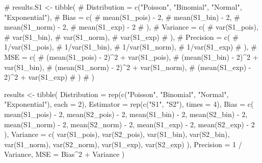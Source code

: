\documentclass[
]{article}
\newenvironment{Shaded}{\begin{snugshade}}{\end{snugshade}}
\newcommand{\AttributeTok}[1]{\textcolor[rgb]{0.40,0.45,0.13}{#1}}
\newcommand{\CommentTok}[1]{\textcolor[rgb]{0.37,0.37,0.37}{#1}}
\newcommand{\DecValTok}[1]{\textcolor[rgb]{0.68,0.00,0.00}{#1}}
\newcommand{\FunctionTok}[1]{\textcolor[rgb]{0.28,0.35,0.67}{#1}}
\newcommand{\NormalTok}[1]{\textcolor[rgb]{0.00,0.23,0.31}{#1}}
\newcommand{\OtherTok}[1]{\textcolor[rgb]{0.00,0.23,0.31}{#1}}
\newcommand{\SpecialCharTok}[1]{\textcolor[rgb]{0.37,0.37,0.37}{#1}}
\newcommand{\StringTok}[1]{\textcolor[rgb]{0.13,0.47,0.30}{#1}}
\begin{document}
\begin{Shaded}
\begin{Highlighting}[numbers=left,,]
\CommentTok{\# results.S1 \textless{}{-} tibble(}
\CommentTok{\#   Distribution = c("Poisson", "Binomial", "Normal", "Exponential"),}
\CommentTok{\#   Bias = c(}
\CommentTok{\#     mean(S1\_pois) {-} 2,}
\CommentTok{\#     mean(S1\_bin) {-} 2,}
\CommentTok{\#     mean(S1\_norm) {-} 2,}
\CommentTok{\#     mean(S1\_exp) {-} 2}
\CommentTok{\#   ),}
\CommentTok{\#   Variance = c(}
\CommentTok{\#     var(S1\_pois),}
\CommentTok{\#     var(S1\_bin),}
\CommentTok{\#     var(S1\_norm),}
\CommentTok{\#     var(S1\_exp)}
\CommentTok{\#   ),}
\CommentTok{\#   Precision = c(}
\CommentTok{\#     1/var(S1\_pois),}
\CommentTok{\#     1/var(S1\_bin),}
\CommentTok{\#     1/var(S1\_norm),}
\CommentTok{\#     1/var(S1\_exp)}
\CommentTok{\#   ),}
\CommentTok{\#   MSE = c(}
\CommentTok{\#     (mean(S1\_pois) {-} 2)\^{}2 + var(S1\_pois),}
\CommentTok{\#     (mean(S1\_bin) {-} 2)\^{}2 + var(S1\_bin),}
\CommentTok{\#     (mean(S1\_norm) {-} 2)\^{}2 + var(S1\_norm),}
\CommentTok{\#     (mean(S1\_exp) {-} 2)\^{}2 + var(S1\_exp)}
\CommentTok{\#   )}
\CommentTok{\# )}

\NormalTok{results }\OtherTok{\textless{}{-}} \FunctionTok{tibble}\NormalTok{(}
  \AttributeTok{Distribution =} \FunctionTok{rep}\NormalTok{(}\FunctionTok{c}\NormalTok{(}\StringTok{"Poisson"}\NormalTok{, }\StringTok{"Binomial"}\NormalTok{, }\StringTok{"Normal"}\NormalTok{, }\StringTok{"Exponential"}\NormalTok{), }\AttributeTok{each =} \DecValTok{2}\NormalTok{),}
  \AttributeTok{Estimator =} \FunctionTok{rep}\NormalTok{(}\FunctionTok{c}\NormalTok{(}\StringTok{"S1"}\NormalTok{, }\StringTok{"S2"}\NormalTok{), }\AttributeTok{times =} \DecValTok{4}\NormalTok{),}
  \AttributeTok{Bias =} \FunctionTok{c}\NormalTok{(}
    \FunctionTok{mean}\NormalTok{(S1\_pois) }\SpecialCharTok{{-}} \DecValTok{2}\NormalTok{, }\FunctionTok{mean}\NormalTok{(S2\_pois) }\SpecialCharTok{{-}} \DecValTok{2}\NormalTok{,}
    \FunctionTok{mean}\NormalTok{(S1\_bin)  }\SpecialCharTok{{-}} \DecValTok{2}\NormalTok{, }\FunctionTok{mean}\NormalTok{(S2\_bin)  }\SpecialCharTok{{-}} \DecValTok{2}\NormalTok{,}
    \FunctionTok{mean}\NormalTok{(S1\_norm) }\SpecialCharTok{{-}} \DecValTok{2}\NormalTok{, }\FunctionTok{mean}\NormalTok{(S2\_norm) }\SpecialCharTok{{-}} \DecValTok{2}\NormalTok{,}
    \FunctionTok{mean}\NormalTok{(S1\_exp)  }\SpecialCharTok{{-}} \DecValTok{2}\NormalTok{, }\FunctionTok{mean}\NormalTok{(S2\_exp)  }\SpecialCharTok{{-}} \DecValTok{2}
\NormalTok{  ),}
  \AttributeTok{Variance =} \FunctionTok{c}\NormalTok{(}
    \FunctionTok{var}\NormalTok{(S1\_pois), }\FunctionTok{var}\NormalTok{(S2\_pois),}
    \FunctionTok{var}\NormalTok{(S1\_bin),  }\FunctionTok{var}\NormalTok{(S2\_bin),}
    \FunctionTok{var}\NormalTok{(S1\_norm), }\FunctionTok{var}\NormalTok{(S2\_norm),}
    \FunctionTok{var}\NormalTok{(S1\_exp),  }\FunctionTok{var}\NormalTok{(S2\_exp)}
\NormalTok{  ),}
  \AttributeTok{Precision =} \DecValTok{1} \SpecialCharTok{/}\NormalTok{ Variance,}
  \AttributeTok{MSE =}\NormalTok{ Bias}\SpecialCharTok{\^{}}\DecValTok{2} \SpecialCharTok{+}\NormalTok{ Variance}
\NormalTok{)}
\end{Highlighting}
\end{Shaded}
\end{document}
